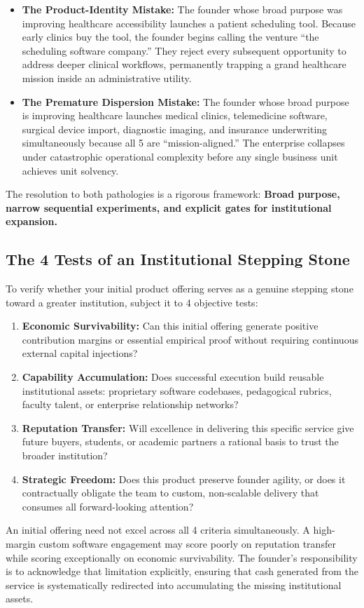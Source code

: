 \begin{itemize}[leftmargin=11pt,itemsep=2pt,topsep=1.5pt,parsep=0pt]
  \item \textbf{The Product-Identity Mistake:} The founder whose broad purpose was improving healthcare accessibility launches a patient scheduling tool. Because early clinics buy the tool, the founder begins calling the venture ``the scheduling software company.'' They reject every subsequent opportunity to address deeper clinical workflows, permanently trapping a grand healthcare mission inside an administrative utility.
  \item \textbf{The Premature Dispersion Mistake:} The founder whose broad purpose is improving healthcare launches medical clinics, telemedicine software, surgical device import, diagnostic imaging, and insurance underwriting simultaneously because all 5 are ``mission-aligned.'' The enterprise collapses under catastrophic operational complexity before any single business unit achieves unit solvency.
\end{itemize}

The resolution to both pathologies is a rigorous framework: \textbf{Broad purpose, narrow sequential experiments, and explicit gates for institutional expansion.}

\subsection{The 4 Tests of an Institutional Stepping Stone}

To verify whether your initial product offering serves as a genuine stepping stone toward a greater institution, subject it to 4 objective tests:

\begin{enumerate}[leftmargin=12pt,itemsep=2.5pt,topsep=1pt,parsep=0pt]
  \item \textbf{Economic Survivability:} Can this initial offering generate positive contribution margins or essential empirical proof without requiring continuous external capital injections?
  \item \textbf{Capability Accumulation:} Does successful execution build reusable institutional assets: proprietary software codebases, pedagogical rubrics, faculty talent, or enterprise relationship networks?
  \item \textbf{Reputation Transfer:} Will excellence in delivering this specific service give future buyers, students, or academic partners a rational basis to trust the broader institution?
  \item \textbf{Strategic Freedom:} Does this product preserve founder agility, or does it contractually obligate the team to custom, non-scalable delivery that consumes all forward-looking attention?
\end{enumerate}

An initial offering need not excel across all 4 criteria simultaneously. A high-margin custom software engagement may score poorly on reputation transfer while scoring exceptionally on economic survivability. The founder's responsibility is to acknowledge that limitation explicitly, ensuring that cash generated from the service is systematically redirected into accumulating the missing institutional assets.
